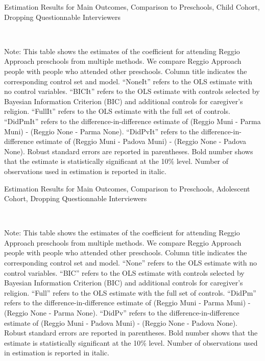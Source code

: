 \begin{table}[H] \caption{Estimation Results for Main Outcomes, Comparison to Preschools, Child Cohort, Dropping Questionnable Interviewers} \label{ols-M-child-reg-pres-dropint}
\scalebox{0.8}{}
\vspace{1ex} \\
\footnotesize\raggedright{Note: This table shows the estimates of the coefficient for attending Reggio Approach preschools from multiple methods. We compare Reggio Approach people with people who attended other preschools. Column title indicates the corresponding control set and model. ``NoneIt'' refers to the OLS estimate with no control variables. ``BICIt'' refers to the OLS estimate with controls selected by Bayesian Information Criterion (BIC) and additional controls for caregiver's religion. ``FullIt'' refers to the OLS estimate with the full set of controls. ``DidPmIt'' refers to the difference-in-difference estimate of (Reggio Muni - Parma Muni) - (Reggio None - Parma None). ``DidPvIt'' refers to the difference-in-difference estimate of (Reggio Muni - Padova Muni) - (Reggio None - Padova None). Robust standard errors are reported in parentheses. Bold number shows that the estimate is statistically significant at the 10\% level. Number of observations used in estimation is reported in italic.}

\end{table}




\begin{table}[H] \caption{Estimation Results for Main Outcomes, Comparison to Preschools, Adolescent Cohort, Dropping Questionnable Interviewers} \label{ols-M-adol-reg-pres-dropint}
\scalebox{0.8}{}
\vspace{1ex} \\
\footnotesize\raggedright{Note: This table shows the estimates of the coefficient for attending Reggio Approach preschools from multiple methods. We compare Reggio Approach people with people who attended other preschools. Column title indicates the corresponding control set and model. ``None'' refers to the OLS estimate with no control variables. ``BIC'' refers to the OLS estimate with controls selected by Bayesian Information Criterion (BIC) and additional controls for caregiver's religion. ``Full'' refers to the OLS estimate with the full set of controls. ``DidPm'' refers to the difference-in-difference estimate of (Reggio Muni - Parma Muni) - (Reggio None - Parma None). ``DidPv'' refers to the difference-in-difference estimate of (Reggio Muni - Padova Muni) - (Reggio None - Padova None). Robust standard errors are reported in parentheses. Bold number shows that the estimate is statistically significant at the 10\% level. Number of observations used in estimation is reported in italic.}
\end{table}



